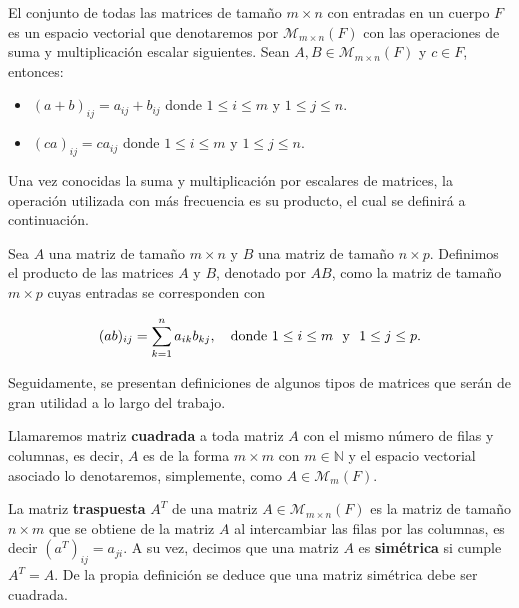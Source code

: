 \begin{observacion}
    El conjunto de todas las matrices de tamaño $m \times n$ con entradas en un cuerpo $F$ es un espacio vectorial que denotaremos por $\mathcal{M}_{m \times n}(F)$ con las operaciones de suma y multiplicación escalar siguientes. Sean $A, B \in \mathcal{M}_{m \times n}(F)$ y $c \in F$, entonces:

    \begin{itemize}
        \item $(a + b)_{ij} = a_{ij} + b_{ij}$ donde $1 \leq i \leq m$ y $1 \leq j \leq n$.
        \item $(ca)_{ij} = ca_{ij}$ donde $1 \leq i \leq m$ y $1 \leq j \leq n$.\newline
    \end{itemize}
\end{observacion}

Una vez conocidas la suma y multiplicación por escalares de matrices, la operación utilizada con más frecuencia es su producto, el cual se definirá a continuación.

\begin{definicion}
    Sea $A$ una matriz de tamaño $m \times n$ y $B$ una matriz de tamaño $n \times p$. Definimos el producto de las matrices $A$ y $B$, denotado por $AB$, como la matriz de tamaño $m \times p$ cuyas entradas se corresponden con

    \[ (ab)_{ij} = \sum_{k=1}^{n} a_{ik}b_{kj}, \quad \text{donde $1 \leq i \leq m$ \space y \space $1 \leq j \leq p$.}\]\newline
\end{definicion}

Seguidamente, se presentan definiciones de algunos tipos de matrices que serán de gran utilidad a lo largo del trabajo.

\begin{definicion}
    Llamaremos matriz \textbf{cuadrada} a toda matriz $A$ con el mismo número de filas y columnas, es decir, $A$ es de la forma $m \times m$ con $m \in \mathbb{N}$ y el espacio vectorial asociado lo denotaremos, simplemente, como $A \in \mathcal{M}_{m}(F)$.\newline
\end{definicion}

\begin{definicion}
    La matriz \textbf{traspuesta} $A^{T}$ de una matriz $A \in \mathcal{M}_{m \times n}(F)$ es la matriz de tamaño $n \times m$ que se obtiene de la matriz $A$ al intercambiar las filas por las columnas, es decir $(a^{T})_{ij} = a_{ji}$. A su vez, decimos que una matriz $A$ es \textbf{simétrica} si cumple $A^{T} = A$. De la propia definición se deduce que una matriz simétrica debe ser cuadrada.\newline
\end{definicion}

